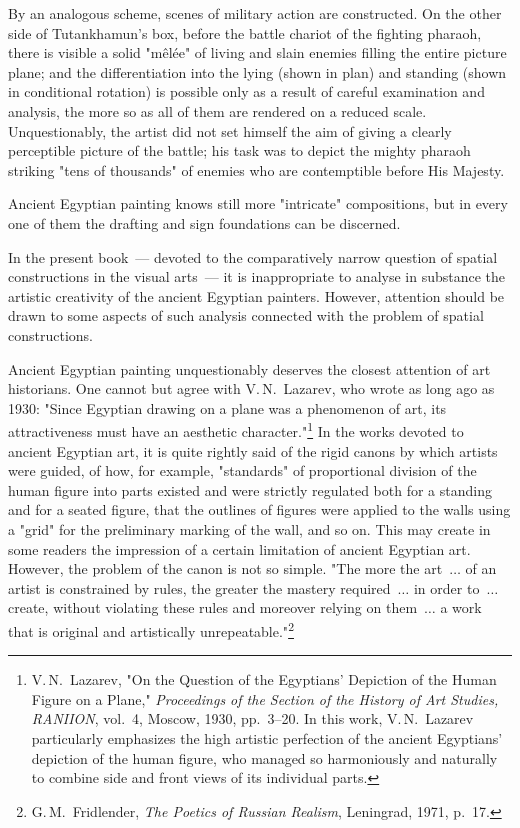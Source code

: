 

By an analogous scheme, scenes of military action are constructed. On the other side
of Tutankhamun's box, before the battle chariot of the fighting pharaoh, there is visible
a solid "mêlée" of living and slain enemies filling the entire picture plane; and the
differentiation into the lying (shown in plan) and standing (shown in conditional rotation)
is possible only as a result of careful examination and analysis, the more so as all of them
are rendered on a reduced scale. Unquestionably, the artist did not set himself the aim
of giving a clearly perceptible picture of the battle; his task was to depict the mighty
pharaoh striking "tens of thousands" of enemies who are contemptible before His
Majesty.

Ancient Egyptian painting knows still more "intricate" compositions, but in every one
of them the drafting and sign foundations can be discerned.

In the present book~--- devoted to the comparatively narrow question of spatial
constructions in the visual arts~--- it is inappropriate to analyse in substance the artistic
creativity of the ancient Egyptian painters. However, attention should be drawn to some
aspects of such analysis connected with the problem of spatial constructions.

Ancient Egyptian painting unquestionably deserves the closest attention of art
historians. One cannot but agree with V.\,N.~Lazarev, who wrote as long ago as 1930:
"Since Egyptian drawing on a plane was a phenomenon of art, its attractiveness must
have an aesthetic character."\footnote{%
  V.\,N.~Lazarev, "On the Question of the Egyptians' Depiction of the Human Figure
  on a Plane," \textit{Proceedings of the Section of the History of Art Studies,
  RANIION}, vol.~4, Moscow, 1930, pp.~3--20. In this work, V.\,N.~Lazarev
  particularly emphasizes the high artistic perfection of the ancient Egyptians'
  depiction of the human figure, who managed so harmoniously and naturally to combine
  side and front views of its individual parts.}
In the works devoted to ancient Egyptian art, it is quite rightly said of the rigid canons
by which artists were guided, of how, for example, "standards" of proportional division
of the human figure into parts existed and were strictly regulated both for a standing
and for a seated figure, that the outlines of figures were applied to the walls using a
"grid" for the preliminary marking of the wall, and so on. This may create in some
readers the impression of a certain limitation of ancient Egyptian art. However, the
problem of the canon is not so simple. "The more the art~$\ldots$ of an artist is
constrained by rules, the greater the mastery required~$\ldots$ in order to~$\ldots$
create, without violating these rules and moreover relying on them~$\ldots$ a work that
is original and artistically unrepeatable."\footnote{%
  G.\,M.~Fridlender, \textit{The Poetics of Russian Realism}, Leningrad, 1971, p.~17.}

